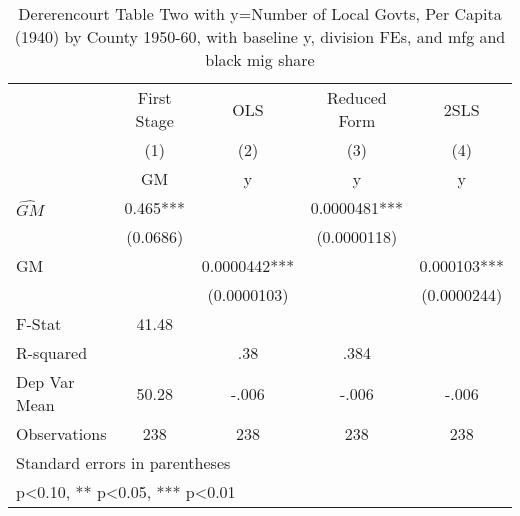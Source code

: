 \begin{table}[htbp]\centering
\def\sym#1{\ifmmode^{#1}\else\(^{#1}\)\fi}
\caption{Dererencourt Table Two with y=Number of Local Govts, Per Capita (1940) by County 1950-60, with baseline y, division FEs, and mfg and black mig share}
\begin{tabular}{l*{4}{c}}
\toprule
                    & First Stage   &         OLS   &Reduced Form   &        2SLS   \\
                    &\multicolumn{1}{c}{(1)}&\multicolumn{1}{c}{(2)}&\multicolumn{1}{c}{(3)}&\multicolumn{1}{c}{(4)}\\
                    &\multicolumn{1}{c}{GM}&\multicolumn{1}{c}{y}&\multicolumn{1}{c}{y}&\multicolumn{1}{c}{y}\\
\midrule
$\hat{GM}$          &       0.465***&               &   0.0000481***&               \\
                    &    (0.0686)   &               & (0.0000118)   &               \\
\addlinespace
GM                  &               &   0.0000442***&               &    0.000103***\\
                    &               & (0.0000103)   &               & (0.0000244)   \\
\midrule
F-Stat              &       41.48   &               &               &               \\
R-squared           &               &         .38   &        .384   &               \\
Dep Var Mean        &       50.28   &       -.006   &       -.006   &       -.006   \\
Observations        &         238   &         238   &         238   &         238   \\
\bottomrule
\multicolumn{5}{l}{\footnotesize Standard errors in parentheses}\\
\multicolumn{5}{l}{\footnotesize * p<0.10, ** p<0.05, *** p<0.01}\\
\end{tabular}
\end{table}
